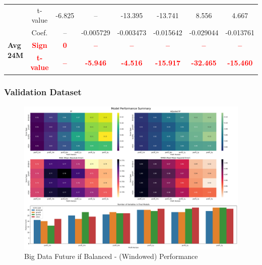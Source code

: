 \documentclass[11pt,english,a4paper,hidelinks]{book}
\begin{document}
\begin{table}[H]
\begin{tabular}{lccccccc}
            & t-value & -6.825    & --        & -13.395   & -13.741   & 8.556     & 4.667     \\
        \cmidrule{1-8}
        \multirow{3}{*}{\textbf{Avg 24M}}
            & Coef.   & --        & -0.005729 & -0.003473 & -0.015642 & -0.029044 & -0.013761 \\
            & \textbf{\textcolor{red}{Sign}}    & \textbf{\textcolor{red}{0}}         & \textbf{\textcolor{red}{–}}         & \textbf{\textcolor{red}{–}}         & \textbf{\textcolor{red}{–}}         & \textbf{\textcolor{red}{–}}         & \textbf{\textcolor{red}{–}}         \\
            & \textbf{\textcolor{red}{t-value}} & \textbf{\textcolor{red}{--}}        & \textbf{\textcolor{red}{-5.946}}    & \textbf{\textcolor{red}{-4.516}}    & \textbf{\textcolor{red}{-15.917}}   & \textbf{\textcolor{red}{-32.465}}   & \textbf{\textcolor{red}{-15.460}}   \\
        \bottomrule
    \end{tabular}
    \label{tab:africa_middle_east_value_consistency}
\end{table}

\subsubsection{Validation Dataset}

\begin{figure}[H]
    \centering
    \includegraphics[width=1\textwidth]{images/code/models/linear_regression/first_model/Big Data future - IF HARD Balanced - Gaussian performance.png}
    \caption{Big Data Future \acrshort{if} Balanced - (Windowed) Performance}
    \label{fig:linear_regression_performance_if_hard_balanced_gaussian}
\end{figure}
\end{document}
